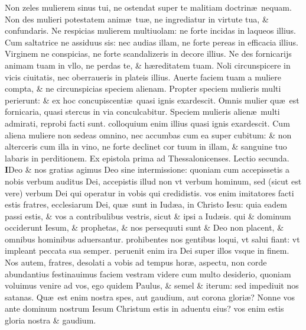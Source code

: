 \documentclass[a5paper,10pt]{book}
\def\leftmarginnote{%
	\lrmarginnote{\hskip -\marginparsep \hskip -6.5em}}
\def\rightmarginnote{%
	\lrmarginnote{\hskip\columnwidth \hskip -1em}}
\def\ae{æ}
\begin{document}
\begin{multicols*}{2}
\newline \indent Non\leftmarginnote{\begin{flushright}ca. 9.\end{flushright}} zeles mulierem sinus tui, ne ostendat super te malitiam doctrin\ae \ nequam.
Non des mulieri potestatem anim\ae \ tu\ae , ne ingrediatur in virtute tua, \& confundaris. Ne respicias mulierem multiuolam: ne forte incidas in laqueos illius.
Cum saltatrice ne assiduus sis: nec audias illam, ne forte pereas in efficacia illius. Virginem ne conspicias, ne forte scandalizeris in decore illius.
Ne des fornicarijs animam tuam in vllo, ne perdas te, \& h\ae reditatem tuam. Noli circunspicere in vicis ciuitatis, nec oberraueris in plateis illius.
Auerte faciem tuam a muliere compta, \& ne circunspicias speciem alienam. Propter speciem mulieris multi perierunt: \& ex hoc concupiscenti\ae \ quasi ignis exardescit.
Omnis mulier qu\ae \ est fornicaria, quasi stercus in via conculcabitur.
Speciem mulieris alien\ae \ multi admirati, reprobi facti sunt. colloquium enim illius quasi ignis
exardescit. Cum aliena muliere non sedeas omnino, nec accumbas cum ea super cubitum: \& non alterceris cum illa in vino, ne forte declinet cor tuum in illam, \& sanguine tuo labaris in perditionem.
\fancyhead[C]{\color{red} Feria. ij. Dominic\ae . iij. Vagantium}
\newline {} \color{red} Ex epistola prima ad Thessalonicenses. \quad Lectio secunda. \color{black}
\vspace{-.25em}
\lettrine[lines=2]{\bfseries \color{red} I}{}Deo\rightmarginnote{ca. 2.} \& nos gratias agimus Deo sine intermissione: quoniam cum accepissetis a nobis verbum auditus Dei, accepistis illud non vt verbum hominum, sed (sicut est vere) verbum Dei qui operatur in vobis qui credidistis. vos enim imitatores facti estis fratres, ecclesiarum Dei, qu\ae \ sunt in Iud\ae a, in Christo Iesu: quia eadem passi estis, \& vos a contribulibus vestris, sicut \& ipsi a Iud\ae is. qui \& dominum occiderunt Iesum, \& prophetas, \& nos persequuti sunt \& Deo non placent, \& omnibus hominibus aduersantur.
prohibentes nos gentibus loqui, vt salui fiant: vt impleant peccata sua semper. peruenit enim ira Dei super illos vsque in finem.
Nos autem, fratres, desolati a vobis ad tempus hor\ae , aspectu, non corde abundantius festinauimus faciem vestram videre cum multo desiderio, quoniam voluimus venire ad vos, ego quidem Paulus, \& semel \& iterum: sed impediuit nos satanas.
Qu\ae \ est enim nostra spes, aut gaudium, aut corona glori\ae ? Nonne vos ante dominum nostrum Iesum Christum estis in aduentu eius? vos enim estis gloria nostra \& gaudium.

\end{multicols*}
\end{document}
